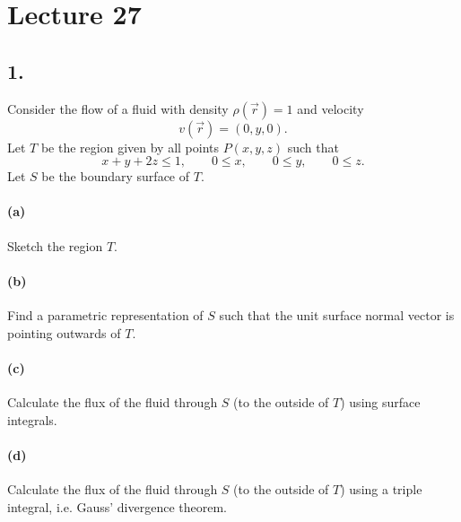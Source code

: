 \section*{Lecture 27}

\subsection*{1.} Consider the flow of a fluid with density $\rho \left( \Vec{r} \right) = 1$ and velocity
\[ 
v \left( \Vec{r} \right) = \left( 0,y,0 \right) 
.\]
Let $T$ be the region given by all points $P (x,y,z)$ such that
\[ 
x+y+2z \leq 1, \qquad 0\leq x, \qquad 0 \leq y, \qquad 0 \leq z
.\]
Let $S$ be the boundary surface of $T$.

\paragraph{(a)} Sketch the region $T$.

\paragraph{(b)} Find a parametric representation of $S$ such that the unit surface normal vector is pointing outwards of $T$.

\paragraph{(c)} Calculate the flux of the fluid through $S$ (to the outside of $T$) using surface integrals.

\paragraph{(d)} Calculate the flux of the fluid through $S$ (to the outside of $T$) using a triple integral, i.e. Gauss' divergence theorem.
